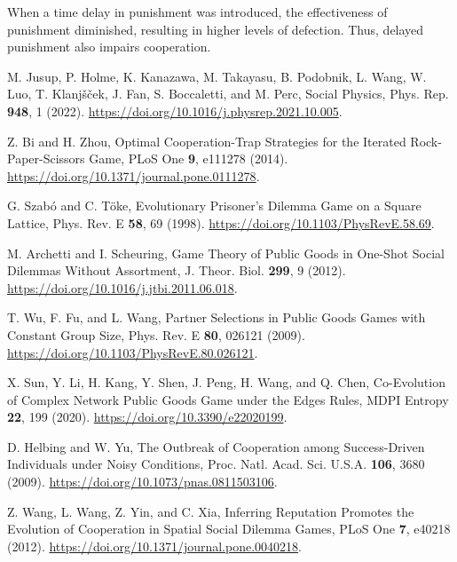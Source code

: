 When a time delay in punishment was introduced, the effectiveness of punishment diminished, resulting in higher levels of defection. Thus, delayed punishment also impairs cooperation. 





\begin{thebibliography}{04}

M. Jusup, P. Holme, K. Kanazawa, M. Takayasu, B. Podobnik, L. Wang, W. Luo, T. Klanjšček, J. Fan, S. Boccaletti, and M. Perc, Social Physics, Phys. Rep. \textbf{948}, 1 (2022). \url{https://doi.org/10.1016/j.physrep.2021.10.005}.

Z. Bi and H. Zhou, Optimal Cooperation-Trap Strategies for the Iterated Rock-Paper-Scissors Game, PLoS One \textbf{9}, e111278 (2014). \url{https://doi.org/10.1371/journal.pone.0111278}.

G. Szabó and C. Töke, Evolutionary Prisoner’s Dilemma Game on a Square Lattice, Phys. Rev. E \textbf{58}, 69 (1998). \url{https://doi.org/10.1103/PhysRevE.58.69}.

M. Archetti and I. Scheuring, Game Theory of Public Goods in One-Shot Social Dilemmas Without Assortment, J. Theor. Biol. \textbf{299}, 9 (2012). \url{https://doi.org/10.1016/j.jtbi.2011.06.018}.

T. Wu, F. Fu, and L. Wang, Partner Selections in Public Goods Games with Constant Group Size, Phys. Rev. E \textbf{80}, 026121 (2009). \url{https://doi.org/10.1103/PhysRevE.80.026121}.

X. Sun, Y. Li, H. Kang, Y. Shen, J. Peng, H. Wang, and Q. Chen, Co-Evolution of Complex Network Public Goods Game under the Edges Rules, MDPI Entropy \textbf{22}, 199 (2020). \url{https://doi.org/10.3390/e22020199}.






D. Helbing and W. Yu, The Outbreak of Cooperation among Success-Driven Individuals under Noisy Conditions, Proc. Natl. Acad. Sci. U.S.A. \textbf{106}, 3680 (2009). \url{https://doi.org/10.1073/pnas.0811503106}.

Z. Wang, L. Wang, Z. Yin, and C. Xia, Inferring Reputation Promotes the Evolution of Cooperation in Spatial Social Dilemma Games, PLoS One \textbf{7}, e40218 (2012). \url{https://doi.org/10.1371/journal.pone.0040218}.


\end{thebibliography}
